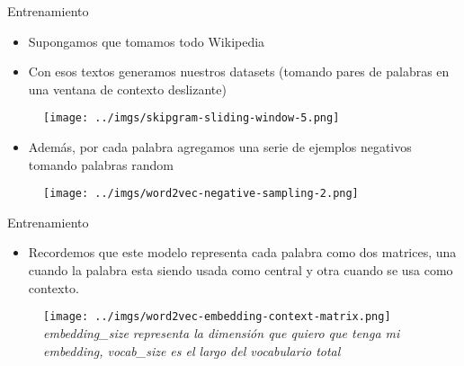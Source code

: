 \documentclass{beamer}
\begin{document}
\begin{frame}{Entrenamiento}
\begin{itemize}
\item Supongamos que tomamos todo Wikipedia
\item Con esos textos generamos nuestros datasets (tomando pares de palabras en una ventana de contexto deslizante)

\end{itemize}

\begin{figure}
    \centering
    \texttt{[image: ../imgs/skipgram-sliding-window-5.png]} %
\end{figure}

\end{frame}
\begin{frame}
\begin{itemize}
\item Además, por cada palabra agregamos una serie de ejemplos negativos tomando palabras random
\end{itemize}

\begin{figure}
    \centering
    \texttt{[image: ../imgs/word2vec-negative-sampling-2.png]} %
\end{figure}
\end{frame}

\begin{frame}{Entrenamiento}
\begin{itemize}
\item Recordemos que este modelo representa cada palabra como dos matrices, una cuando la palabra esta siendo usada como central y otra cuando se usa como contexto.

\end{itemize}
        \vspace{0.5em}
\begin{figure}
    \centering
    \begin{minipage}{0.65\textwidth}
        \centering
        \texttt{[image: ../imgs/word2vec-embedding-context-matrix.png]}
        {\scriptsize \textit{embedding\_size representa la dimensión que quiero que tenga mi embedding, vocab\_size es el largo del vocabulario total}}
    \end{minipage}
\end{figure}
\end{frame}
\end{document}
